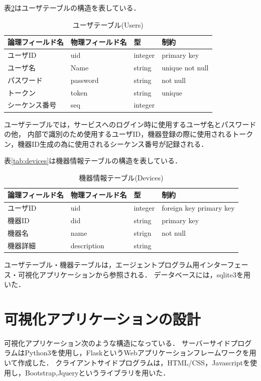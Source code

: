 表\ref{tab:users}はユーザテーブルの構造を表している．
\begin{table}[htb]
\begin{center}
\caption{ユーザテーブル(Users)}
\begin{tabular}{|l|l|l|l|} \hline
論理フィールド名 & 物理フィールド名 & 型 & 制約 \\ \hline \hline
ユーザID & uid & integer & primary key \\ \hline
ユーザ名 & Name & string & unique not null \\ \hline
パスワード & password & string & not null \\ \hline
トークン & token & string & unique \\ \hline
シーケンス番号 & seq & integer & \\ \hline
\end{tabular}
\label{tab:users}
\end{center}
\end{table}
ユーザテーブルでは，サービスへのログイン時に使用するユーザ名とパスワードの他，
内部で識別のため使用するユーザID，機器登録の際に使用されるトークン，機器ID生成の為に使用されるシーケンス番号が記録される．

表\ref{tab:devices}は機器情報テーブルの構造を表している．
\begin{table}[htb]
\begin{center}
\caption{機器情報テーブル(Devices)}
\begin{tabular}{|l|l|l|l|} \hline
論理フィールド名 & 物理フィールド名 & 型 & 制約 \\ \hline \hline
ユーザID & uid & integer & foreign key primary key \\ \hline
機器ID & did & string & primary key \\ \hline
機器名 & name & strign & not null \\ \hline
機器詳細 & description & string & \\ \hline
\end{tabular}
\label{tab:users}
\end{center}
\end{table}

ユーザテーブル・機器テーブルは，エージェントプログラム用インターフェース・可視化アプリケーションから参照される．
データベースには，sqlite3を用いた．


\section{可視化アプリケーションの設計}
可視化アプリケーション次のような構造になっている．
サーバーサイドプログラムはPython3を使用し，FlaskというWebアプリケーションフレームワークを用いて作成した．
クライアントサイドプログラムは，HTML/CSS，Javascriptを使用し，Bootstrap,Jqueryというライブラリを用いた．


